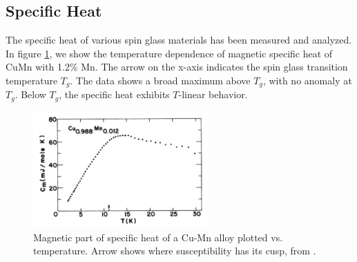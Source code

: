 \subsection{Specific Heat}

The specific heat of various spin glass materials has been measured and analyzed. 
In figure \ref{fig:cu-mn-cv}, we show the temperature dependence of magnetic 
specific heat of CuMn with 1.2\% Mn. The arrow on the x-axis indicates the spin glass
transition temperature $T_g$. The data shows a broad maximum above $T_g$, with no
anomaly at $T_g$. Below $T_g$, the specific heat exhibits $T$-linear behavior.

\begin{figure}
  \centering
  \includegraphics[width=0.6\textwidth]{img/cv.png}
\caption{\label{fig:cu-mn-cv}Magnetic part of specific heat of a Cu-Mn alloy plotted vs. temperature. Arrow shows where susceptibility has its cusp, from \citet{PhysRevB.13.4053}.}
\end{figure}

  

